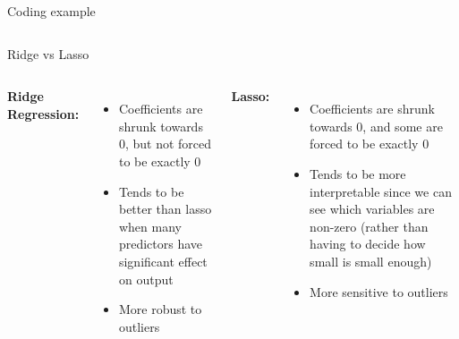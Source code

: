 \documentclass[aspectratio=169,usenames,dvipsnames]{beamer}
\newcommand{\InstructorList}[1]{
\begin{itemize}
	\color{orange}
	#1
\end{itemize}
}
\begin{document}
{
\begin{frame}[t]{Coding example}
\begin{columns}
\centering
{}
\centering
\end{columns}
\end{frame}
}

\begin{frame}[t]{Ridge vs Lasso}
\begin{columns}
\centering
\textbf{Ridge Regression:}
\InstructorList{
  \item Coefficients are shrunk towards 0, but not forced to be exactly 0
  \item Tends to be better than lasso when many predictors have significant effect on output 
  \item More robust to outliers
}

\centering
\textbf{Lasso:}
\InstructorList{
  \item Coefficients are shrunk towards 0, and some are forced to be exactly 0
  \item Tends to be more interpretable since we can see which variables are non-zero (rather than having to decide how small is small enough)
  \item More sensitive to outliers
}
\end{columns}
\end{frame}

	
	
	
	
	
\end{document}
